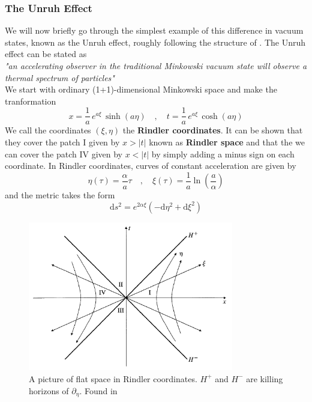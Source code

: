 \subsubsection{The Unruh Effect}
We will now briefly go through the simplest example of this difference in vacuum states, known as the Unruh effect, roughly following the structure of \cite{GR}. The Unruh effect can be stated as \\
\textit{"an accelerating observer in the traditional Minkowski vacuum state will observe a thermal spectrum of particles"} \cite{GR} \\
We start with ordinary (1+1)-dimensional Minkowski space and make the tranformation
%
\begin{equation}
x = \frac{1}{a} \, e^{a \xi} \, \sinh(a \eta) \quad, \quad
t = \frac{1}{a} \, e^{a \xi} \, \cosh(a \eta)
\end{equation}
%
We call the coordinates $(\xi, \eta)$ the \textbf{Rindler coordinates}. It can be shown that they cover the patch I given by $x>|t|$ known as \textbf{Rindler space} and that the we can cover the patch IV given by $x<|t|$ by simply adding a minus sign on each coordinate. In Rindler coordinates, curves of constant acceleration are given by
\begin{equation}
\eta(\tau) = \frac{\alpha}{a} \tau \quad, \quad
\xi(\tau) = \frac{1}{a} \ln \left( \frac{a}{\alpha} \right)
\end{equation}
and the metric takes the form
\begin{equation}
\mathrm{d}s^2 = e^{2 \alpha \xi} (- \mathrm{d} \eta^2 + \mathrm{d} \xi^2 )
\end{equation}
%
%
\begin{figure}[h!]
%
\centering
%
\includegraphics[width=0.8\textwidth]{../pics/Rindler_space.png}
%
\caption{A picture of flat space in Rindler coordinates. $H^+$ and $H^-$ are killing horizons of $\partial_{\eta}$. Found in \cite{GR}}
%
\end{figure}
